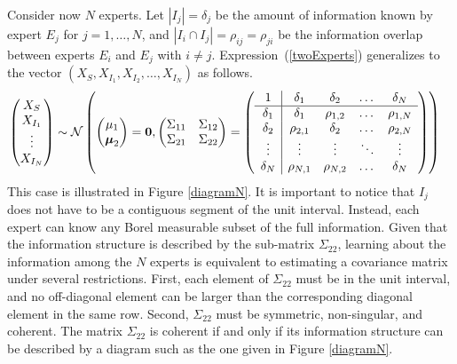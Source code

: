 \documentclass[11pt]{article}
\theoremstyle{definition}
\theoremstyle{definition}
\begin{document}
Consider now $N$ experts. Let $|I_j| = \delta_j$ be the amount of 
information known by expert $E_j$ for $j = 1, \dots, N$, and 
$|I_i \cap I_j| = \rho_{ij} = \rho_{ji}$ be the information overlap 
between experts $E_i$ and $E_j$ with $i \neq j$. 
Expression~(\ref{twoExperts}) generalizes to the vector 
$(X_{S}, X_{I_1}, X_{I_2}, \dots, X_{I_N})$ as follows.
\begin{align}
\left(\begin{matrix} X_S \\ X_{I_1}\\ \vdots \\ X_{I_N} \end{matrix}\right) &\sim \mathcal{N}\left( \left(\begin{matrix} 
\mu_1 \\ \boldsymbol{\mu}_2
 \end{matrix}\right) =
 \boldsymbol{0}, \left(\begin{matrix} 
\Sigma_{11} & \Sigma_{12}\\
\Sigma_{21} & \Sigma_{22}\\
 \end{matrix}\right) 
 =
 \left(\begin{array}{c | c c cc }
1 & \delta_1 & \delta_2 & \dots & \delta_N  \\ \hline
\delta_1 & \delta_1 &\rho_{1,2} & \dots & \rho_{1,N}   \\ 
\delta_2 & \rho_{2,1} & \delta_2 & \dots & \rho_{2,N}  \\ 
\vdots & \vdots & \vdots & \ddots & \vdots  \\ 
\delta_N & \rho_{N,1} & \rho_{N,2} & \dots & \delta_N\\ 
 \end{array}\right)\right)  \label{NExperts}
\end{align}
This case is illustrated in Figure \ref{diagramN}.  It is important 
to notice that $I_j$ does not have to be a contiguous segment of 
the unit interval.  Instead, each expert can know any Borel measurable 
subset of the full information.  Given that the information structure 
is described by the sub-matrix $\Sigma_{22}$, learning about the 
information among the $N$ experts is equivalent to estimating 
a covariance matrix under several restrictions.  First, each element 
of $\Sigma_{22}$ must be in the unit interval, and no off-diagonal 
element can be larger than the corresponding diagonal element in 
the same row. Second, $\Sigma_{22}$ must be symmetric, non-singular, 
and coherent. The matrix $\Sigma_{22}$ is coherent if and only if 
its information structure can be described by a diagram such as 
the one given in Figure \ref{diagramN}. 
\end{document}
